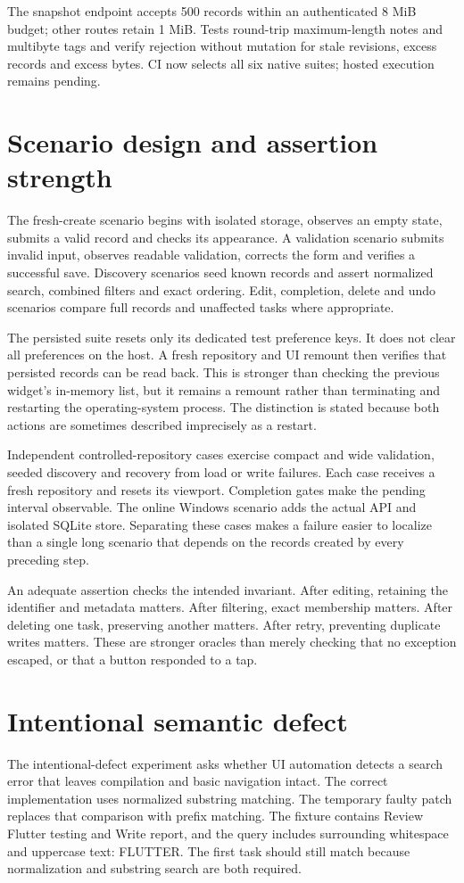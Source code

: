 \documentclass[12pt,a4paper,oneside]{report}
\begin{document}
The snapshot endpoint accepts 500 records within an authenticated 8 MiB budget; other routes retain 1 MiB. Tests round-trip maximum-length notes and multibyte tags and verify rejection without mutation for stale revisions, excess records and excess bytes. CI now selects all six native suites; hosted execution remains pending.

\section{Scenario design and assertion strength}
The fresh-create scenario begins with isolated storage, observes an empty state, submits a valid record and checks its appearance. A validation scenario submits invalid input, observes readable validation, corrects the form and verifies a successful save. Discovery scenarios seed known records and assert normalized search, combined filters and exact ordering. Edit, completion, delete and undo scenarios compare full records and unaffected tasks where appropriate.

The persisted suite resets only its dedicated test preference keys. It does not clear all preferences on the host. A fresh repository and UI remount then verifies that persisted records can be read back. This is stronger than checking the previous widget's in-memory list, but it remains a remount rather than terminating and restarting the operating-system process. The distinction is stated because both actions are sometimes described imprecisely as a restart.

Independent controlled-repository cases exercise compact and wide validation, seeded discovery and recovery from load or write failures. Each case receives a fresh repository and resets its viewport. Completion gates make the pending interval observable. The online Windows scenario adds the actual API and isolated SQLite store. Separating these cases makes a failure easier to localize than a single long scenario that depends on the records created by every preceding step.

An adequate assertion checks the intended invariant. After editing, retaining the identifier and metadata matters. After filtering, exact membership matters. After deleting one task, preserving another matters. After retry, preventing duplicate writes matters. These are stronger oracles than merely checking that no exception escaped, or that a button responded to a tap.

\section{Intentional semantic defect}
The intentional-defect experiment asks whether UI automation detects a search error that leaves compilation and basic navigation intact. The correct implementation uses normalized substring matching. The temporary faulty patch replaces that comparison with prefix matching. The fixture contains Review Flutter testing and Write report, and the query includes surrounding whitespace and uppercase text: FLUTTER. The first task should still match because normalization and substring search are both required.
\end{document}
